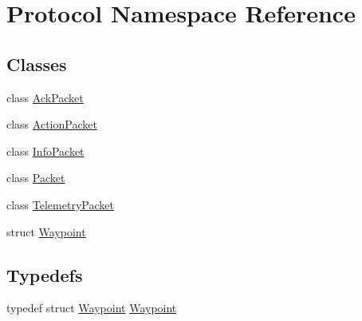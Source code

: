 \hypertarget{namespace_protocol}{}\section{Protocol Namespace Reference}
\label{namespace_protocol}
\subsection*{Classes}
\begin{DoxyCompactItemize}
\item 
class \hyperlink{class_protocol_1_1_ack_packet}{Ack\+Packet}
\item 
class \hyperlink{class_protocol_1_1_action_packet}{Action\+Packet}
\item 
class \hyperlink{class_protocol_1_1_info_packet}{Info\+Packet}
\item 
class \hyperlink{class_protocol_1_1_packet}{Packet}
\item 
class \hyperlink{class_protocol_1_1_telemetry_packet}{Telemetry\+Packet}
\item 
struct \hyperlink{struct_protocol_1_1_waypoint}{Waypoint}
\end{DoxyCompactItemize}
\subsection*{Typedefs}
\begin{DoxyCompactItemize}
\item 
typedef struct \hyperlink{struct_protocol_1_1_waypoint}{Waypoint} \hyperlink{namespace_protocol_a5a64ef0b3c8cee827111b106b3aaf25a}{Waypoint}
\end{DoxyCompactItemize}
